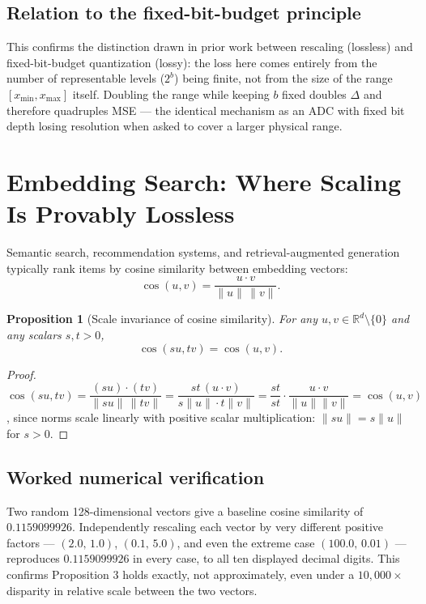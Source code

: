 \documentclass[10pt,journal,compsoc]{IEEEtran}
\newtheorem{proposition}{Proposition}
\begin{document}
\subsection{Relation to the fixed-bit-budget principle}
This confirms the distinction drawn in prior work between rescaling (lossless) and fixed-bit-budget quantization (lossy): the loss here comes entirely from the number of representable levels ($2^b$) being finite, not from the size of the range $[x_{\min},x_{\max}]$ itself. Doubling the range while keeping $b$ fixed doubles $\Delta$ and therefore quadruples MSE — the identical mechanism as an ADC with fixed bit depth losing resolution when asked to cover a larger physical range.

\section{Embedding Search: Where Scaling Is Provably Lossless}
Semantic search, recommendation systems, and retrieval-augmented generation typically rank items by cosine similarity between embedding vectors:
\begin{equation}
    \cos(u,v) = \frac{u\cdot v}{\lVert u\rVert\,\lVert v\rVert}.
\end{equation}

\begin{proposition}[Scale invariance of cosine similarity]
For any $u,v\in\mathbb{R}^d\setminus\{0\}$ and any scalars $s,t>0$,
\begin{equation}
    \cos(su, tv) = \cos(u,v).
\end{equation}
\end{proposition}
\begin{proof}
$\cos(su,tv) = \dfrac{(su)\cdot(tv)}{\lVert su\rVert\,\lVert tv\rVert} = \dfrac{st\,(u\cdot v)}{s\lVert u\rVert \cdot t\lVert v\rVert} = \dfrac{st}{st}\cdot\dfrac{u\cdot v}{\lVert u\rVert\lVert v\rVert} = \cos(u,v)$, since norms scale linearly with positive scalar multiplication: $\lVert su\rVert = s\lVert u\rVert$ for $s>0$.
\end{proof}

\subsection{Worked numerical verification}
Two random 128-dimensional vectors give a baseline cosine similarity of $0.1159099926$. Independently rescaling each vector by very different positive factors — $(2.0,\,1.0)$, $(0.1,\,5.0)$, and even the extreme case $(100.0,\,0.01)$ — reproduces $0.1159099926$ in every case, to all ten displayed decimal digits. This confirms Proposition 3 holds exactly, not approximately, even under a $10{,}000\times$ disparity in relative scale between the two vectors.
\end{document}
